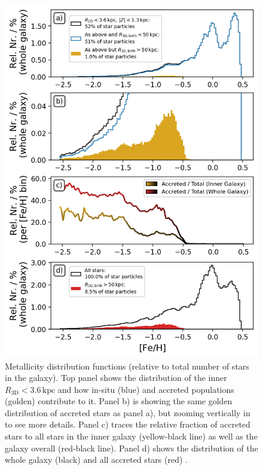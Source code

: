 \documentclass[fleqn,usenatbib]{mnras}
\begin{document}
\begin{figure}
    \centering
    \includegraphics[width=\columnwidth]{figures/fe_h_histogram_inner_galaxy.png}
    \caption{Metallicity distribution functions (relative to total number of stars in the galaxy). Top panel shows the distribution of the inner $R_\mathrm{3D} < 3.6\,\mathrm{kpc}$ and how in-situ (blue) and accreted populations (golden) contribute to it. Panel b) is showing the same golden distribution of accreted stars as panel a), but zooming vertically in to see more details. Panel c) traces the relative fraction of accreted stars to all stars in the inner galaxy (yellow-black line) as well as the galaxy overall (red-black line). Panel d) shows the distribution of the whole galaxy (black) and all accreted stars (red) \href{https://github.com/svenbuder/golden_thread_I/tree/main/figures}{\faGithub}.}
    \label{fig:fe_h_histogram_inner_galaxy}
\end{figure}
\end{document}
